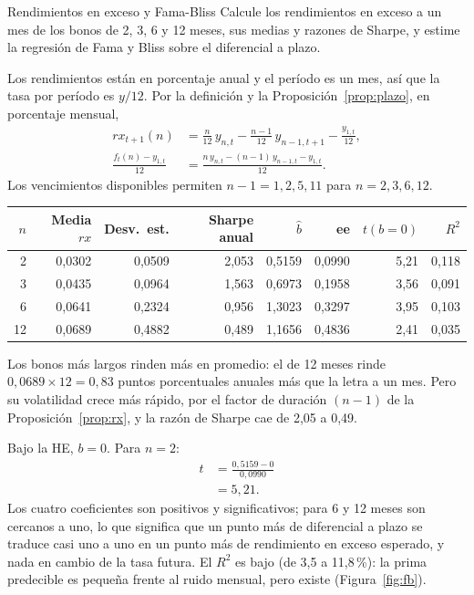 \begin{ejresuelto}{Rendimientos en exceso y Fama-Bliss}\label{ej:fb}
\enunciado Calcule los rendimientos en exceso a un mes de los bonos de 2, 3, 6 y 12 meses, sus medias y razones de Sharpe, y
estime la regresión de Fama y Bliss sobre el diferencial a plazo.

\solucion
{} Los rendimientos están en porcentaje anual y el período es un mes, así que la tasa por período es
$y/12$. Por la definición y la Proposición~\ref{prop:plazo}, en porcentaje mensual,
\begin{align*}
  rx_{t+1}(n) &= \frac{n}{12}\,y_{n,t}-\frac{n-1}{12}\,y_{n-1,t+1}-\frac{y_{1,t}}{12},\\
  \frac{f_t(n)-y_{1,t}}{12} &= \frac{n\,y_{n,t}-(n-1)\,y_{n-1,t}-y_{1,t}}{12}.
\end{align*}
Los vencimientos disponibles permiten $n-1=1,2,5,11$ para $n=2,3,6,12$.

\begin{center}\small
\begin{tabular}{@{}rrrrrrrr@{}}
\toprule
$n$ & Media $rx$ & Desv.\ est. & Sharpe anual & $\hat b$ & ee & $t(b=0)$ & $R^2$ \\
\midrule
2  & 0,0302 & 0,0509 & 2,053 & 0,5159 & 0,0990 & 5,21 & 0,118 \\
3  & 0,0435 & 0,0964 & 1,563 & 0,6973 & 0,1958 & 3,56 & 0,091 \\
6  & 0,0641 & 0,2324 & 0,956 & 1,3023 & 0,3297 & 3,95 & 0,103 \\
12 & 0,0689 & 0,4882 & 0,489 & 1,1656 & 0,4836 & 2,41 & 0,035 \\
\bottomrule
\end{tabular}
\end{center}
Los bonos más largos rinden más en promedio: el de 12 meses rinde $0{,}0689\times12=0{,}83$ puntos porcentuales anuales más
que la letra a un mes. Pero su volatilidad crece más rápido, por el factor de duración $(n-1)$ de la
Proposición~\ref{prop:rx}, y la razón de Sharpe cae de 2,05 a 0,49.

 Bajo la HE, $b=0$. Para $n=2$:
\begin{align*}
  t &= \frac{0{,}5159-0}{0{,}0990}\\
    &= 5{,}21 .
\end{align*}
Los cuatro coeficientes son positivos y significativos; para 6 y 12 meses son cercanos a uno, lo que significa que un
punto más de diferencial a plazo se traduce casi uno a uno en un punto más de rendimiento en exceso esperado, y nada en
cambio de la tasa futura. El $R^2$ es bajo (de 3,5 a 11,8\,\%): la prima predecible es pequeña frente al ruido mensual, pero
existe (Figura~\ref{fig:fb}).


\end{ejresuelto}
